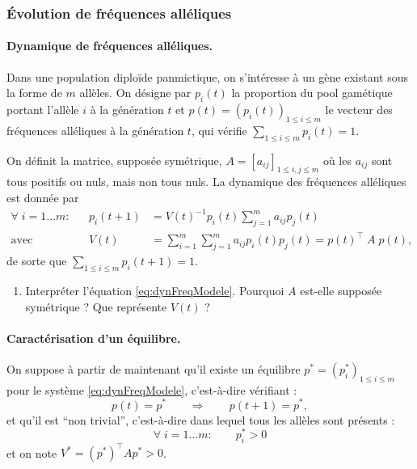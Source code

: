 \subsubsection{\'Evolution de fréquences alléliques}

\paragraph{Dynamique de fréquences alléliques.}
Dans une population diploïde panmictique, on s’intéresse à un gène existant sous la forme de $m$ allèles. On désigne par $p_i(t)$ la proportion du pool gamétique portant l’allèle $i$  à la génération $t$ et $p(t) = (p_i(t))_{1 \leq i \leq m}$ le vecteur des fréquences alléliques à la génération $t$, qui vérifie $\sum_{1 \leq i \leq m}p_i(t) = 1$. 

On définit la matrice, supposée symétrique, $A = [a_{ij}]_{1 \leq i, j \leq m}$ où les $a_{ij}$ sont tous positifs ou nuls, mais non tous nuls. La dynamique des fréquences alléliques est donnée par
\begin{align} \label{eq:dynFreqModele}
  \forall \; i = 1 \dots m: & & 
  p_i(t+1) & = V(t)^{-1} p_i(t) \sum_{j=1}^m a_{ij} p_j(t) \\
  \text{avec} & & 
  V(t) & = \sum_{i=1}^m \sum_{j=1}^m a_{ij} p_i(t) p_j(t) = p(t)^\top \; A \; p(t), \nonumber
\end{align}
de sorte que $\sum_{1 \leq i \leq m} p_i(t+1) = 1$.

\bigskip
\begin{enumerate}
  \item Interpréter l'équation \eqref{eq:dynFreqModele}. Pourquoi $A$ est-elle supposée symétrique ? Que représente $V(t)$ ?
\end{enumerate}

\paragraph{Caractérisation d'un équilibre.}
On suppose à partir de maintenant qu'il existe un équilibre $p^* = (p^*_i)_{1 \leq i \leq m}$ pour le système \eqref{eq:dynFreqModele}, c'est-à-dire vérifiant : 
$$
p(t) = p^* \qquad \Rightarrow \qquad p(t+1) = p^*,
$$
et qu'il est ``non trivial'', c'est-à-dire dans lequel tous les allèles sont présents : 
$$
\forall \; i = 1 \dots m: \qquad p^*_i > 0
$$
et on note $V^* = (p^*)^\top A p^* > 0$.

